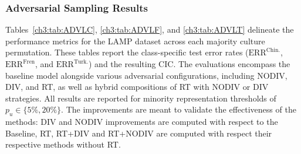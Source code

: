 \subsubsection{Adversarial Sampling Results}
\label{ch3:sec:res:discr}
Tables~\ref{ch3:tab:ADVLC}, \ref{ch3:tab:ADVLF}, and \ref{ch3:tab:ADVLT} delineate the performance metrics for the LAMP dataset across each majority culture permutation. 
These tables report the class-specific test error rates ($\text{ERR}^{\text{Chin.}}$, $\text{ERR}^{\text{Fren}}$, and $\text{ERR}^{\text{Turk.}}$) and the resulting CIC. 
The evaluations encompass the baseline model alongside various adversarial configurations, including NODIV, DIV, and RT, as well as hybrid compositions of RT with NODIV or DIV strategies. 
All results are reported for minority representation thresholds of $p_u \in \{5\%, 20\%\}$.
The improvements are meant to validate the effectiveness of the methods: DIV and NODIV improvements are computed with respect to the Baseline, RT, RT+DIV and RT+NODIV are computed with respect their respective methods without RT.
%
